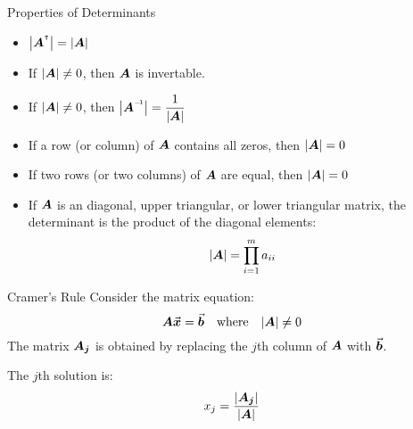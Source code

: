 \documentclass{beamer}
\begin{document}
\begin{frame}
\begin{block}{Properties of Determinants}
\begin{itemize}[<+- | alert@+>]
\item $\abs{\transposeof{\mat{A}}}=\abs{\mat{A}}$
\item If ${\left\lvert \boldsymbol{A}\right\rvert}\neq 0$, then $\boldsymbol{A}$ is invertable.
\item If ${\left\lvert \boldsymbol{A}\right\rvert}\neq 0$, then $\abs{\inverseof{\mat{A}}}=\dfrac{1}{\abs{\mat{A}}}$
\item If a row (or column) of $\boldsymbol{A}$ contains all zeros, then ${\left\lvert \boldsymbol{A}\right\rvert}=0$
\item If two rows (or two columns) of $\boldsymbol{A}$ are equal, then ${\left\lvert \boldsymbol{A}\right\rvert}=0$
\item If $\boldsymbol{A}$ is an diagonal, upper triangular, or lower triangular matrix, the determinant is the product of the diagonal elements:
\begin{equation*}
{\left\lvert \boldsymbol{A}\right\rvert}=\prod_{i=1}^{m} a_{ii}
\end{equation*}
\end{itemize}
\end{block}
\end{frame}

\begin{frame}
\begin{block}{Cramer's Rule}
Consider the matrix equation:
\begin{equation*}
\boldsymbol{A}{\vec{\boldsymbol{x}}}={\vec{\boldsymbol{b}}}\quad \text{where}\quad{\left\lvert \boldsymbol{A}\right\rvert}\neq0
\end{equation*}
The matrix $\boldsymbol{A_j}$ is obtained by replacing the $j$th column of $\boldsymbol{A}$ with ${\vec{\boldsymbol{b}}}$. 

\vspace{2mm}
The $j$th solution is:
\begin{equation*}
x_j = \dfrac{{\left\lvert \boldsymbol{A_j}\right\rvert}}{{\left\lvert \boldsymbol{A}\right\rvert}}
\end{equation*}
\end{block}
\end{frame}

\end{document}
